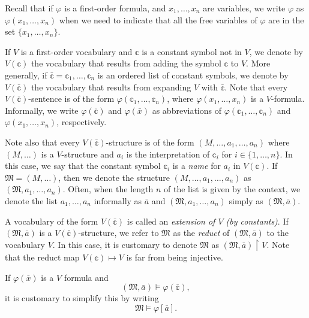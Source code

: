 \documentclass{scrartcl}
\renewcommand{\phi}{\varphi}
\begin{document}
Recall that if $\phi$ is a first-order formula, and $x_1,\dots, x_n$ are variables, we write $\phi$ as $\phi(x_1,\dots, x_n)$ when we need to indicate that all the free variables of $\phi$ are in the set $\{x_1,\dots, x_n\}$.

If $V$ is a first-order vocabulary and $\mathbb{c}$ is a constant symbol not in $V$, we denote by $V(\mathbb{c})$ the vocabulary that results from adding the symbol $\mathbb{c}$ to $V$. More generally, if $\bar{\mathbb{c}}=\mathbb{c}_1,\dots, \mathbb{c}_n$ is an ordered list of constant symbols, we denote by $V(\bar{\mathbb{c}})$ the vocabulary that results from expanding $V$ with $\bar{\mathbb{c}}$. Note that every $V(\bar{\mathbb{c}})$-sentence is of the form $\varphi(\mathbb{c}_1,\dots, \mathbb{c}_n)$, where 
$\varphi(x_1,\dots, x_n)$ is a $V$-formula. 
Informally, we write $\varphi(\bar{\mathbb{c}})$ and  $\varphi(\bar x)$ as abbreviations of 
$\varphi(\mathbb{c}_1,\dots, \mathbb{c}_n)$ and  $\varphi(x_1,\dots, x_n)$, respectively.

Note also that every $V(\bar{\mathbb{c}})$-structure is of the form
$(M, \dots, a_1,\dots, a_n)$
where $(M, \dots)$ is a $V$-structure and $a_i$ is the interpretation of $\mathbb{c}_i$ for $i\in\{1,\dots, n\}$. In this case, we say that the constant symbol $\mathbb{c}_i$ is a \emph{name} for $a_i$ in $V(\mathbb{c})$.
If $\mathfrak{M}=(M,\dots)$, then we denote the structure
$(M, \dots, a_1,\dots, a_n)$ as $(\mathfrak{M}, a_1, \dots, a_n)$. Often, when the length $n$ of the list is given by the context, we denote the list $a_1,\dots, a_n$ informally as $\bar a$ and $(\mathfrak{M}, a_1, \dots, a_n)$ simply as $(\mathfrak{M}, \bar a)$.

A vocabulary of the form $V(\bar{\mathbb{c}})$ is called an \emph{extension of $V$ (by constants)}. If $(\mathfrak{M}, \bar a)$ is a $V(\bar{\mathbb{c}})$-structure, we refer to $\mathfrak{M}$ as the \emph{reduct} of $(\mathfrak{M}, \bar a)$ to the vocabulary $V$. In this case, it is customary to denote $\mathfrak{M}$ as
$(\mathfrak{M}, \bar a)\upharpoonright V$. Note that the reduct map $V(\mathbb{c})\mapsto V$ is far from being injective.



\begin{notation}
If $\varphi(\bar{x})$ is a $V$ formula and 
\[
(\mathfrak{M}, \bar a)\models \varphi(\bar{\mathbb{c}}),
\]
it is customary to simplify this by writing
\[
\mathfrak{M}\models \varphi[\bar a].
\]
\end{notation}
\end{document}
